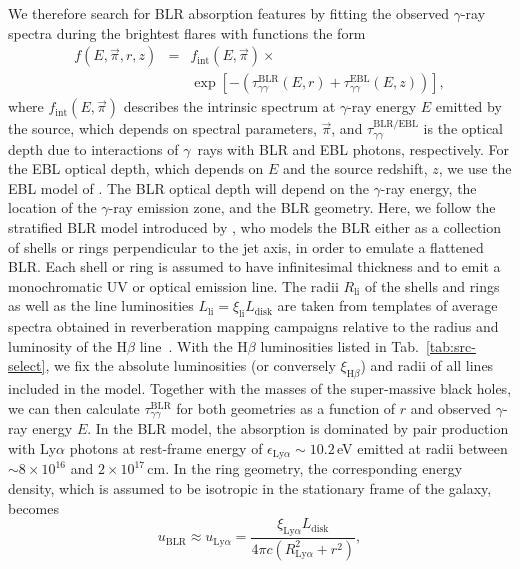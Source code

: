 \documentclass[twocolumn,linenumbers]{aastex62}
\newcommand{\Grays}{$\gamma$~rays\xspace}
\newcommand{\gray}{$\gamma$-ray\xspace}
\begin{document}
We therefore search for BLR absorption features by fitting the observed \gray spectra during the brightest flares with functions the form 
\begin{eqnarray}
    f(E,\vec{\pi},r,z) &=& f_\mathrm{int}(E,\vec{\pi}) \times \nonumber \\ &{}& \exp\left[-\left(\tau_{\gamma\gamma}^\mathrm{BLR}(E,r) +\tau_{\gamma\gamma}^\mathrm{EBL}(E,z) \right)  \right],
\end{eqnarray} 
where $f_\mathrm{int}(E, \vec{\pi})$ describes the intrinsic spectrum at \gray energy $E$ emitted by the source, which depends on spectral parameters, $\vec{\pi}$, and $\tau_{\gamma\gamma}^\mathrm{BLR / EBL}$ is the optical depth due to interactions of \Grays with BLR and EBL photons, respectively. 
For the EBL optical depth, which depends on $E$ and the source redshift, $z$, we use the EBL model of \citet{2011MNRAS.410.2556D}.
The BLR optical depth will depend on the \gray energy, the location of the \gray emission zone, and the BLR geometry. 
Here, we follow the stratified BLR model introduced by \citet{finke2016}, who models the BLR either as a collection of shells or rings perpendicular to the jet axis, in order to emulate a flattened BLR. 
Each shell or ring is assumed to have infinitesimal thickness and to emit a monochromatic UV or optical emission line. 
The radii $R_\mathrm{li}$ of the shells and rings as well as the line luminosities $L_\mathrm{li} = \xi_\mathrm{li}L_\mathrm{disk}$ are taken from templates of average spectra obtained in reverberation mapping campaigns relative to the radius and luminosity of the H$\beta$ line~\citep[see][for further details]{finke2016}.
With the H$\beta$ luminosities listed in Tab.~\ref{tab:src-select}, we fix the absolute luminosities (or conversely $\xi_{\mathrm{H}\beta}$) and radii of all lines included in the model.  
Together with the masses of the super-massive black holes, we can then calculate $\tau_{\gamma\gamma}^\mathrm{BLR}$ for both geometries as a function of $r$ and observed \gray energy $E$.
In the BLR model, the absorption is dominated by pair production with Ly$\alpha$ photons at rest-frame energy of $\epsilon_{\mathrm{Ly}\alpha}\sim10.2\,$eV emitted at radii between $\sim 8\times10^{16}$ and $2\times10^{17}$\,cm. 
In the ring geometry, the corresponding energy density, which is assumed to be isotropic in the stationary frame of the galaxy, becomes~\citep{finke2016}
    \begin{equation}
        u_\mathrm{BLR} \approx u_{\mathrm{Ly}\alpha}= \frac{\xi_{\mathrm{Ly}\alpha}L_\mathrm{disk}}{4\pi c(R_{\mathrm{Ly}\alpha}^2 + r^2)},
        \label{eq:u-blr}
    \end{equation}
\end{document}
